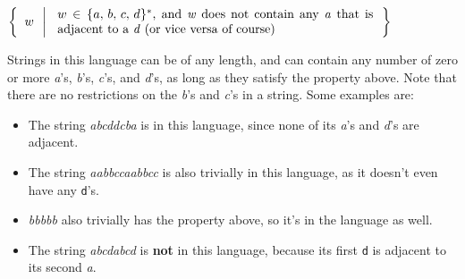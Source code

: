 \documentclass[11pt]{article}
\newcommand{\sms}{\ensuremath{\hspace{.1mm}}}
\begin{document}
\begin{enumerate}
\begin{centering}
            \vspace{.25mm}

            \(
              \left\{
                \ \:
                \begin{array}[c]{@{}l}
                w
                \end{array}
                \left| \ \ \:
                \parbox[c]{3.5in}{
                  $w \sms \in \sms \{ \sms a, \, b , \, c , \, d \sms \}^*$,
                  and \emph{w} does not contain any \emph{a} that is adjacent
                  to a \emph{d} (or vice versa of course)
                }
              \ \:
              \right.
              \right\}
            \)

            \vspace{1.5mm}

          \end{centering}

          Strings in this language can be of any length, and can contain any
          number of zero or more \emph{a}'s, \emph{b}'s, \emph{c}'s, and
          \emph{d}'s, as long as they satisfy the property above.  Note that
          there are no restrictions on the \emph{b}'s and \emph{c}'s in a
          string.  Some examples are:

          \vspace{-2.75mm}

          \begin{itemize}

            \addtolength{\itemsep}{-.5mm}

            \item The string \emph{abcddcba} is in this language, since none
                  of its \emph{a}'s and \emph{d}'s are adjacent.

            \item The string \emph{aabbccaabbcc} is also trivially in this
                  language, as it doesn't even have any \texttt{d}'s.

            \item \emph{bbbbb} also trivially has the property above, so
                  it's in the language as well.

            \item The string \emph{abcdabcd} is \textbf{not} in this
                  language, because its first \texttt{d} is adjacent to its
                  second \emph{a}.

          \end{itemize}


\end{enumerate}
\end{document}
